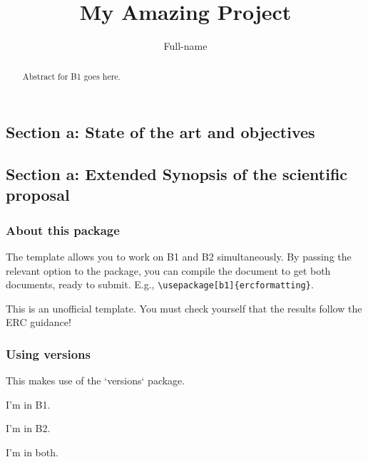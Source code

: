 \documentclass{article}
\author[Last-name]{Full-name}
\title{My Amazing Project}
\begin{document}
\maketitle



\begin{b1}
	\begin{abstract}
		Abstract for B1 goes here.
	\end{abstract}
\end{b1}





\begin{b2}
	\part{Section a: State of the art and objectives}
\end{b2}
\begin{b1}
	\part{Section a: Extended Synopsis of the scientific proposal}
\end{b1}


\section{About this package}

The template allows you to work on B1 and B2 simultaneously. By passing the relevant option to the package, you can compile the document to get both documents, ready to submit.  E.g., \verb|\usepackage[b1]{ercformatting}|.


This is an unofficial template. You must check yourself that the results follow the ERC guidance!

\section{Using versions}

This makes use of the `versions` package.

\begin{b1}
I'm in B1.
\end{b1}

\begin{b2}
I'm in B2.
\end{b2}

I'm in both.
\end{document}
